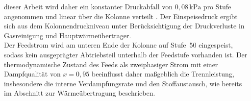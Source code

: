 dieser Arbeit wird daher ein konstanter Druckabfall von
\(0{,}08\,\mathrm{kPa}\) pro Stufe angenommen und linear über die Kolonne
verteilt \cite{heinz-wolfgangharingAirGasesNitrogen200}. Der Einspeisedruck ergibt sich aus dem
Kolonnendruckniveau unter Berücksichtigung der Druckverluste in Gasreinigung
und Hauptwärmeübertrager. \\
Der Feedstrom wird am unteren Ende der Kolonne auf Stufe~50 eingespeist, sodass kein ausgeprägter Abtriebsteil unterhalb der Feedstufe vorhanden ist. Der thermodynamische Zustand des Feeds als zweiphasiger Strom mit einer Dampfqualität von \(x=0{,}95\) beeinflusst daher maßgeblich die
Trennleistung, insbesondere die interne Verdampfungsrate und den Stoffaustausch, wie bereits im Abschnitt zur Wärmeübertragung beschrieben. \\

